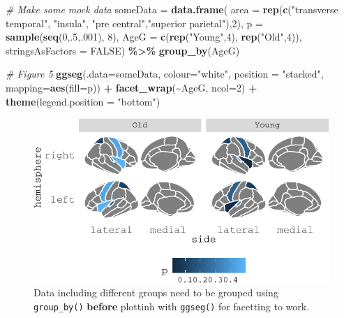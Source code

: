 \documentclass[fleqn,10pt]{wlpeerj} %
\newenvironment{Shaded}{\begin{snugshade}}{\end{snugshade}}
\newcommand{\CommentTok}[1]{\textcolor[rgb]{0.56,0.35,0.01}{\textit{#1}}}
\newcommand{\DataTypeTok}[1]{\textcolor[rgb]{0.13,0.29,0.53}{#1}}
\newcommand{\DecValTok}[1]{\textcolor[rgb]{0.00,0.00,0.81}{#1}}
\newcommand{\KeywordTok}[1]{\textcolor[rgb]{0.13,0.29,0.53}{\textbf{#1}}}
\newcommand{\NormalTok}[1]{#1}
\newcommand{\OperatorTok}[1]{\textcolor[rgb]{0.81,0.36,0.00}{\textbf{#1}}}
\newcommand{\OtherTok}[1]{\textcolor[rgb]{0.56,0.35,0.01}{#1}}
\newcommand{\StringTok}[1]{\textcolor[rgb]{0.31,0.60,0.02}{#1}}
\begin{document}
\begin{Shaded}
\begin{Highlighting}[]
\CommentTok{\# Make some mock data}
\NormalTok{someData =}\StringTok{ }\KeywordTok{data.frame}\NormalTok{(}
  \DataTypeTok{area =} \KeywordTok{rep}\NormalTok{(}\KeywordTok{c}\NormalTok{(}\StringTok{"transverse temporal"}\NormalTok{, }\StringTok{"insula"}\NormalTok{,}
               \StringTok{"pre central"}\NormalTok{,}\StringTok{"superior parietal"}\NormalTok{),}\DecValTok{2}\NormalTok{),}
  \DataTypeTok{p =} \KeywordTok{sample}\NormalTok{(}\KeywordTok{seq}\NormalTok{(}\DecValTok{0}\NormalTok{,.}\DecValTok{5}\NormalTok{,.}\DecValTok{001}\NormalTok{), }\DecValTok{8}\NormalTok{),}
  \DataTypeTok{AgeG =} \KeywordTok{c}\NormalTok{(}\KeywordTok{rep}\NormalTok{(}\StringTok{"Young"}\NormalTok{,}\DecValTok{4}\NormalTok{), }\KeywordTok{rep}\NormalTok{(}\StringTok{"Old"}\NormalTok{,}\DecValTok{4}\NormalTok{)),}
  \DataTypeTok{stringsAsFactors =} \OtherTok{FALSE}\NormalTok{) }\OperatorTok{\%>\%}
\StringTok{  }\KeywordTok{group\_by}\NormalTok{(AgeG)}

\CommentTok{\# Figure 5}
\KeywordTok{ggseg}\NormalTok{(}\DataTypeTok{.data=}\NormalTok{someData, }\DataTypeTok{colour=}\StringTok{"white"}\NormalTok{, }\DataTypeTok{position =} \StringTok{"stacked"}\NormalTok{,}
      \DataTypeTok{mapping=}\KeywordTok{aes}\NormalTok{(}\DataTypeTok{fill=}\NormalTok{p)) }\OperatorTok{+}
\StringTok{  }\KeywordTok{facet\_wrap}\NormalTok{(}\OperatorTok{\textasciitilde{}}\NormalTok{AgeG, }\DataTypeTok{ncol=}\DecValTok{2}\NormalTok{) }\OperatorTok{+}
\StringTok{  }\KeywordTok{theme}\NormalTok{(}\DataTypeTok{legend.position =} \StringTok{"bottom"}\NormalTok{)}
\end{Highlighting}
\end{Shaded}

\begin{figure}
\centering
\includegraphics{draft_2_files/figure-latex/datasupp3-1.pdf}
\caption{\label{fig:datasupp3}Data including different groups need to be grouped using \texttt{group\_by()} \textbf{before} plottinh with \texttt{ggseg()} for facetting to work.}
\end{figure}
\end{document}
